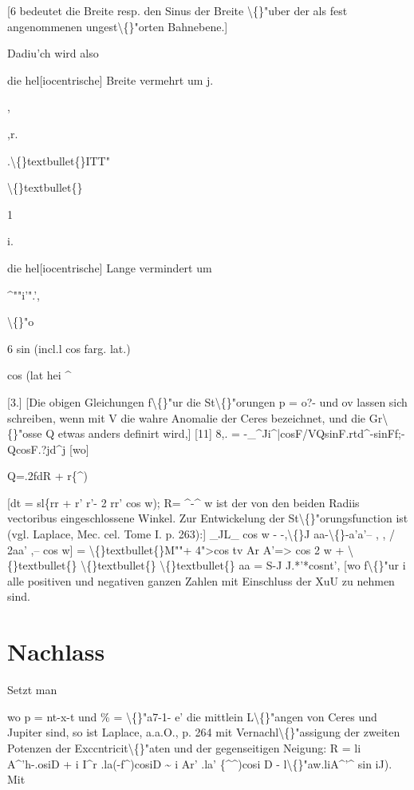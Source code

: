 \documentclass[10pt,a4paper]{article}
\begin{document}
[6 bedeutet die Breite resp. den Sinus der Breite \textbackslash\{\}"uber der als fest angenommenen ungest\textbackslash\{\}"orten Bahnebene.]

Dadiu'ch wird also

die hel[iocentrische] Breite vermehrt um
j.

,

,r.

.\textbackslash\{\}textbullet\{\}ITT"

\textbackslash\{\}textbullet\{\}

1

i.

die hel[iocentrische] Lange vermindert um

\textasciicircum{}""i'".',

\textbackslash\{\}"o

6 sin (incl.l cos farg. lat.)

cos (lat hei \textasciicircum{}

[3.]
[Die obigen Gleichungen f\textbackslash\{\}"ur die St\textbackslash\{\}"orungen
p = o?- und ov lassen sich
schreiben, wenn mit V die wahre Anomalie
der Ceres bezeichnet, und die
Gr\textbackslash\{\}"osse Q etwas anders definirt wird,]
[11] 8,. = -\_\textasciicircum{}Ji\textasciicircum{}|cosF/VQsinF.rtd\textasciicircum{}-sinFf;-QcosF.?jd\textasciicircum{}j
[wo]

Q=.2fdR + r\{\textasciicircum{})

[dt = sl\{rr + r' r'- 2 rr' cos w);
R= \textasciicircum{}-\textasciicircum{}
w ist der von den beiden Radiis vectoribus eingeschlossene Winkel.
Zur Entwickelung der St\textbackslash\{\}"orungsfunction ist (vgl. Laplace, Mec. cel. Tome I.
p. 263):]
\_JL\_
cos w - -,\textbackslash\{\}J aa-\textbackslash\{\}-a'a'--
, , / 2aa'
,-- cos w] = \textbackslash\{\}textbullet\{\}M""+ 4">cos tv Ar A'=> cos 2 w + \textbackslash\{\}textbullet\{\} \textbackslash\{\}textbullet\{\} \textbackslash\{\}textbullet\{\}
aa
= S-J J.*'*cosnt',
[wo f\textbackslash\{\}"ur i alle positiven und negativen ganzen Zahlen mit Einschluss der XuU
zu nehmen sind.

\newpage

\section*{Nachlass}

Setzt man

wo p = nt-x-t und \% = \textbackslash\{\}"a7-1- e' die mittlein L\textbackslash\{\}"angen von Ceres und Jupiter
sind, so ist Laplace, a.a.O., p. 264 mit Vernachl\textbackslash\{\}"assigung der zweiten Potenzen der Exccntricit\textbackslash\{\}"aten und der gegenseitigen Neigung:
R = li A\textasciicircum{}'h-.osiD + i I\textasciicircum{}r .la(-f\textasciicircum{})cosiD \textasciitilde{} i Ar' .la' \{\textasciicircum{}\textasciicircum{})cosi D
- l\textbackslash\{\}"aw.liA\textasciicircum{}'\textasciicircum{} sin iJ).
Mit
\end{document}
